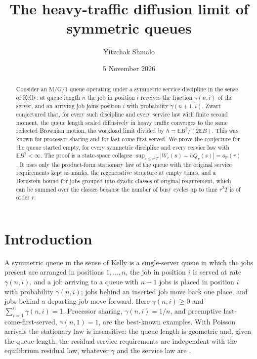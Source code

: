 \documentclass[11pt]{amsart}
\title{The heavy-traffic diffusion limit of symmetric queues}
\author{Yitzchak Shmalo}
\date{5 November 2026}
\theoremstyle{remark}
\numberwithin{equation}{section}
\newcommand{\E}{\mathbb E}
\newcommand{\Pp}{\mathbb P}
\newcommand{\1}{\mathbf 1}
\begin{document}
\begin{abstract}
Consider an M/G/1 queue operating under a symmetric service discipline in the sense of Kelly: at queue length $n$ the job in position $i$ receives the fraction $\gamma(n,i)$ of the server, and an arriving job joins position $i$ with probability $\gamma(n+1,i)$. Zwart conjectured that, for every such discipline and every service law with finite second moment, the queue length scaled diffusively in heavy traffic converges to the same reflected Brownian motion, the workload limit divided by $h=\E B^2/(2\E B)$. This was known for processor sharing and for last-come-first-served. We prove the conjecture for the queue started empty, for every symmetric discipline and every service law with $\E B^2<\infty$. The proof is a state-space collapse $\sup_{s\le r^2T}|W_r(s)-hQ_r(s)|=o_{\Pp}(r)$. It uses only the product-form stationary law of the queue with the original service requirements kept as marks, the regenerative structure at empty times, and a Bernstein bound for jobs grouped into dyadic classes of original requirement, which can be summed over the classes because the number of busy cycles up to time $r^2T$ is of order $r$.
\end{abstract}
\maketitle

\section{Introduction}\label{sec:intro}

A symmetric queue in the sense of Kelly \cite{Kel} is a single-server queue in which the jobs present are arranged in positions $1,\dots,n$, the job in position $i$ is served at rate $\gamma(n,i)$, and a job arriving to a queue with $n-1$ jobs is placed in position $i$ with probability $\gamma(n,i)$; jobs behind an inserted job move back one place, and jobs behind a departing job move forward. Here $\gamma(n,i)\ge0$ and $\sum_{i=1}^n\gamma(n,i)=1$. Processor sharing, $\gamma(n,i)=1/n$, and preemptive last-come-first-served, $\gamma(n,1)=1$, are the best-known examples. With Poisson arrivals the stationary law is insensitive: the queue length is geometric and, given the queue length, the residual service requirements are independent with the equilibrium residual law, whatever $\gamma$ and the service law are \cite{Kel}.
\end{document}
